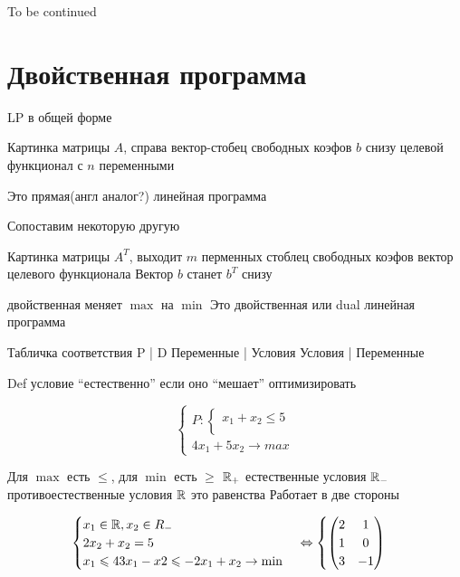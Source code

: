 To be continued

\section*{Двойственная программа}

LP в общей форме

Картинка матрицы $A$, справа вектор-стобец свободных коэфов $b$
снизу целевой функционал с $n$ переменными

Это прямая(англ аналог?) линейная программа

Сопоставим некоторую другую

Картинка матрицы $A^T$, выходит $m$ перменных стоблец свободных коэфов вектор целевого функционала
Вектор $b$ станет $b^T$ снизу

двойственная меняет $\max$ на $\min$
Это двойственная или dual линейная программа

Табличка соответствия
P | D
Переменные | Условия
Условия | Переменные

Def условие ``естественно'' если оно ``мешает'' оптимизировать

\[
	\begin{cases}
	P: \begin{cases}
		x_1 + x_2 \leq 5\\
	\end{cases}\\
	4x_1 + 5x_2 \to max
	\end{cases}
\]

Для $\max$ есть $\leq$, для $\min$ есть $\geq$
$\mathbb{R}_+$ естественные условия
$\mathbb{R}_-$ противоестественные условия
$\mathbb{R}$ это равенства
Работает в две стороны

\[
	\begin{cases}
		x_1 \in \mathbb{R}, x_2 \in R_{-}\\
		2x_2 + x_2 = 5\\
		x_1 \leqslant 4
		3 x_1 - x2 \leqslant -2
		x_1 + x_2 \to \min
	\end{cases}
	\Leftrightarrow
	\begin{cases}
		\left(\begin{matrix}
		 2 & 1\\
		 1 & 0\\
		 3 & -1
		\end{matrix}\right)
	\end{cases}
\]

